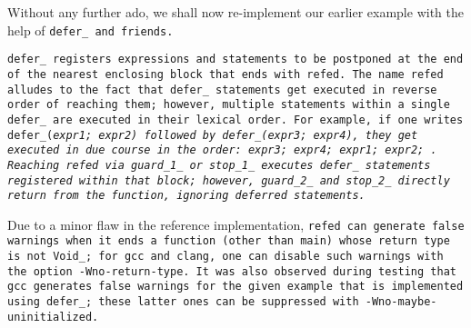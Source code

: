 Without any further ado, we shall now re-implement our
earlier example with the help of \tt{defer_} and friends.


\tt{defer_} registers expressions and statements to be postponed
at the end of the nearest enclosing block that ends with \tt{refed}.
The name \tt{refed} alludes to the fact that \tt{defer_} statements get
executed in reverse order of reaching them; however, multiple statements
within a single \tt{defer_} are executed in their lexical order.
For example, if one writes \tt{defer_(}\it{expr1}\tt{;} \it{expr2}\tt{)}
followed by \tt{defer_(}\it{expr3}\tt{;} \it{expr4}\tt{)},
they get executed in due course in the order:
\it{expr3}\tt{;} \it{expr4}\tt{;} \it{expr1}\tt{;} \it{expr2}\tt{;} .
Reaching \tt{refed} via \tt{guard_1_} or \tt{stop_1_} executes \tt{defer_}
statements registered within that block; however, \tt{guard_2_} and \tt{stop_2_}
directly return from the function, ignoring deferred statements.

\note Due to a minor flaw in the reference implementation,
\tt{refed} can generate false warnings when it ends a function (other than
\tt{main}) whose return type is not \tt{Void_}; for \tt{gcc} and \tt{clang},
one can disable such warnings with the option \tt{-Wno-return-type}.
It was also observed during testing that \tt{gcc} generates false
warnings for the given example that is implemented using \tt{defer_};
these latter ones can be suppressed with \tt{-Wno-maybe-uninitialized}.

